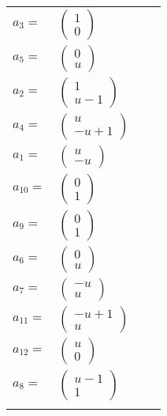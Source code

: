 \documentclass[1p]{elsarticle_modified}
\theoremstyle{definition}
\begin{document}
\begin{tabular}{m{7pt} m{180pt} m{7pt} m{180pt} }
\flushright $a_{3}=$&$\begin{pmatrix}1\\0\end{pmatrix}$ \\
\flushright $a_{5}=$&$\begin{pmatrix}0\\u\end{pmatrix}$ \\
\flushright $a_{2}=$&$\begin{pmatrix}1\\u-1\end{pmatrix}$ \\
\flushright $a_{4}=$&$\begin{pmatrix}u\\- u+1\end{pmatrix}$ \\
\flushright $a_{1}=$&$\begin{pmatrix}u\\- u\end{pmatrix}$ \\
\flushright $a_{10}=$&$\begin{pmatrix}0\\1\end{pmatrix}$ \\
\flushright $a_{9}=$&$\begin{pmatrix}0\\1\end{pmatrix}$ \\
\flushright $a_{6}=$&$\begin{pmatrix}0\\u\end{pmatrix}$ \\
\flushright $a_{7}=$&$\begin{pmatrix}- u\\u\end{pmatrix}$ \\
\flushright $a_{11}=$&$\begin{pmatrix}- u+1\\u\end{pmatrix}$ \\
\flushright $a_{12}=$&$\begin{pmatrix}u\\0\end{pmatrix}$ \\
\flushright $a_{8}=$&$\begin{pmatrix}u-1\\1\end{pmatrix}$\\&\end{tabular}
\end{document}
